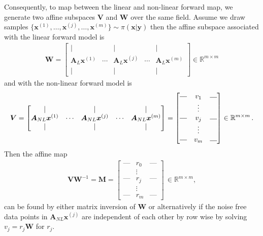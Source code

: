 Consequently, to map between the linear and non-linear forward map, we generate two affine subspaces $\bm{V}$ and $\bm{W}$ over the same field.
Assume we draw samples $\{\bm{x}^{(1)}, \dots, \bm{x}^{(j)}, \dots ,\bm{x}^{(m)}\} \sim \pi(\bm{x}|\bm{y})$ then the affine subspace associated with the linear forward model is \begin{align}
	\bm{W} = \begin{bmatrix}
		\vert&   &  \vert & & \vert \\
		\bm{A}_{L} \bm{x}^{(1)} &  \cdots& \bm{A}_{L} \bm{x}^{(j)} &  \cdots & \bm{A}_{L} \bm{x}^{(m)} \\
		\vert&   &  \vert & & \vert 
	\end{bmatrix}\in \mathbb{R}^{m \times m}
\end{align} and with the non-linear forward model is 
\begin{align}
	\bm{V} = \begin{bmatrix}
		\vert&   &  \vert & & \vert \\
		\bm{A}_{NL}\bm{x}^{(1)} &  \cdots& \bm{A}_{NL}\bm{x}^{(j)} &  \cdots & \bm{A}_{NL} \bm{x}^{(m)}  \\
		\vert&   &  \vert & & \vert 
	\end{bmatrix} = 
	\begin{bmatrix}
		\rule[.5ex]{1em}{0.4pt} & v_1 &	\rule[.25ex]{1em}{0.4pt}\\
		&\vdots  & \\
		\rule[.5ex]{1em}{0.4pt} &v_j &	\rule[.25ex]{1em}{0.4pt}\\
		&\vdots  & \\
		\rule[.5ex]{1em}{0.4pt}& v_m&	\rule[.25ex]{1em}{0.4pt}
	\end{bmatrix} \in \mathbb{R}^{m \times m} \, .
\end{align}
Then the affine map 
\begin{align}
	\bm{V}\bm{W}^{-1} = \bm{M} = \begin{bmatrix}
		\text{---} & r_0 &   \text{---}  \\
		&  \vdots  & \\
		\text{---}& r_j &  \text{---} \\
		&  \vdots  & \\
		\text{---} & r_m &   \text{---}
	\end{bmatrix} \, \in \mathbb{R}^{m \times m} ,
\end{align}
can be found by either matrix inversion of $\bm{W}$ or alternatively if the noise free data points in $\bm{A}_{NL}\bm{x}^{(j)}$ are independent of each other by row wise by solving $v_j = r_j \bm{W}$ for $ r_j $.


